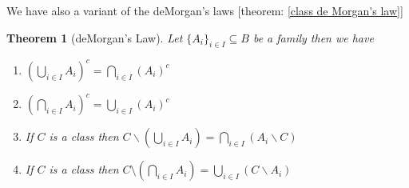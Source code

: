 \documentclass{book}
\newtheorem{theorem}{Theorem}
\begin{document}
We have also a variant of the deMorgan's laws [theorem: \ref{class de Morgan's
law}]

\begin{theorem}[deMorgan's Law]
  \label{family de Morgan}Let $\{ A_i \}_{i \in I} \subseteq B$ be a family
  then we have
  \begin{enumerate}
    \item $\left( \bigcup_{i \in I} A_i \right)^c = \bigcap_{i \in I} (A_i)^c$
    
    \item $\left( \bigcap_{i \in I} A_i \right)^c = \bigcup_{i \in I} (A_i)^c$
    
    \item If $C$ is a class then $C\backslash \left( \bigcup_{i \in I} A_i
    \right) = \bigcap_{i \in I} (A_i \backslash C)$
    
    \item If $C$ is a class then $C \setminus \left( \bigcap_{i \in I} A_i
    \right) = \bigcup_{i \in I} (C\backslash A_i)$
  \end{enumerate}
\end{theorem}
\end{document}
